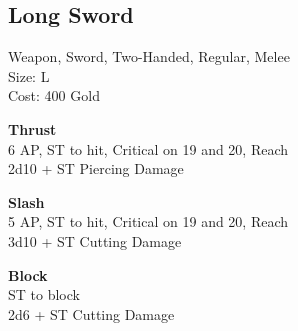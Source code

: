\subsection{Long Sword}\label{weapon:longSword}
Weapon, Sword, Two-Handed, Regular, Melee\\
Size: L\\
Cost: 400 Gold

\textbf{Thrust}\\
6 AP, ST to hit, Critical on 19 and 20,  Reach\\
2d10 + \texttimes ST Piercing Damage

\textbf{Slash}\\
5 AP, ST to hit, Critical on 19 and 20,  Reach\\
3d10 + \texttimes ST Cutting Damage

\textbf{Block}\\
ST to block\\
2d6 + \texttimes ST Cutting Damage